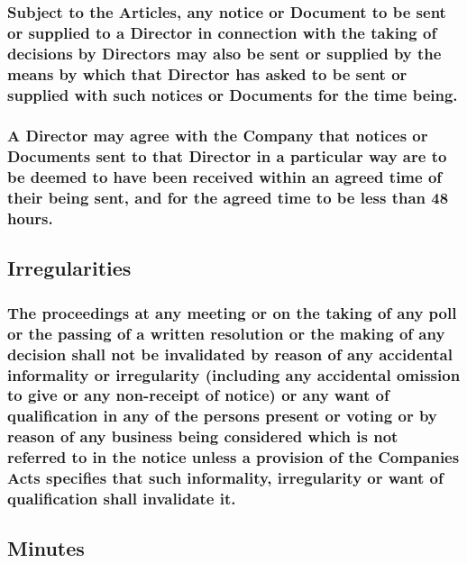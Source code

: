 \documentclass[12pt]{article}
\begin{document}
\subsubsection[Specifics of communication with Directors]{Subject to the Articles, any notice or Document to be sent or supplied to a Director in connection with the taking of decisions by Directors may also be sent or supplied by the means by which that Director has asked to be sent or supplied with such notices or Documents for the time being.}
\subsubsection[Receipt of communication with Directors]{A Director may agree with the Company that notices or Documents sent to that Director in a particular way are to be deemed to have been received within an agreed time of their being sent, and for the agreed time to be less than 48 hours.}

\subsection{Irregularities}
\subsubsection[Specifics of irregularities]{The proceedings at any meeting or on the taking of any poll or the passing of a written resolution or the making of any decision shall not be invalidated by reason of any accidental informality or irregularity (including any accidental omission to give or any non-receipt of notice) or any want of qualification in any of the persons present or voting or by reason of any business being considered which is not referred to in the notice unless a provision of the Companies Acts specifies that such informality, irregularity or want of qualification shall invalidate it.}

\subsection{Minutes}\label{subsection:minutes}
\end{document}
